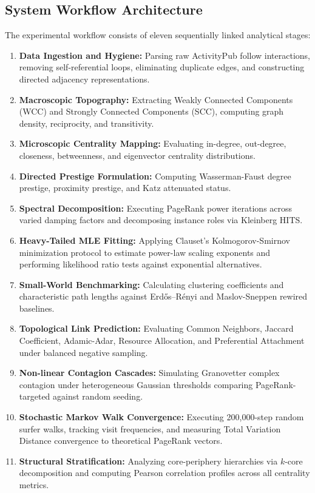 \documentclass[conference]{IEEEtran}
\begin{document}
\subsection{System Workflow Architecture}
The experimental workflow consists of eleven sequentially linked analytical stages:
\begin{enumerate}
    \item \textbf{Data Ingestion and Hygiene:} Parsing raw ActivityPub follow interactions, removing self-referential loops, eliminating duplicate edges, and constructing directed adjacency representations.
    \item \textbf{Macroscopic Topography:} Extracting Weakly Connected Components (WCC) and Strongly Connected Components (SCC), computing graph density, reciprocity, and transitivity.
    \item \textbf{Microscopic Centrality Mapping:} Evaluating in-degree, out-degree, closeness, betweenness, and eigenvector centrality distributions.
    \item \textbf{Directed Prestige Formulation:} Computing Wasserman-Faust degree prestige, proximity prestige, and Katz attenuated status.
    \item \textbf{Spectral Decomposition:} Executing PageRank power iterations across varied damping factors and decomposing instance roles via Kleinberg HITS.
    \item \textbf{Heavy-Tailed MLE Fitting:} Applying Clauset's Kolmogorov-Smirnov minimization protocol to estimate power-law scaling exponents and performing likelihood ratio tests against exponential alternatives.
    \item \textbf{Small-World Benchmarking:} Calculating clustering coefficients and characteristic path lengths against Erd\H{o}s--R\'enyi and Maslov-Sneppen rewired baselines.
    \item \textbf{Topological Link Prediction:} Evaluating Common Neighbors, Jaccard Coefficient, Adamic-Adar, Resource Allocation, and Preferential Attachment under balanced negative sampling.
    \item \textbf{Non-linear Contagion Cascades:} Simulating Granovetter complex contagion under heterogeneous Gaussian thresholds comparing PageRank-targeted against random seeding.
    \item \textbf{Stochastic Markov Walk Convergence:} Executing 200,000-step random surfer walks, tracking visit frequencies, and measuring Total Variation Distance convergence to theoretical PageRank vectors.
    \item \textbf{Structural Stratification:} Analyzing core-periphery hierarchies via $k$-core decomposition and computing Pearson correlation profiles across all centrality metrics.
\end{enumerate}
\end{document}
